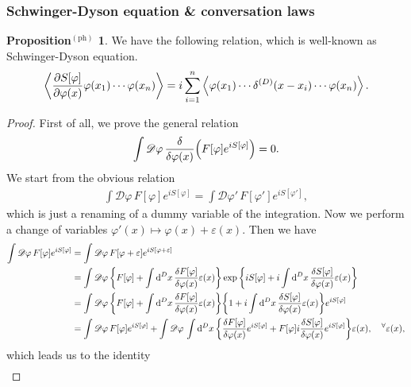 \documentclass{article}
\theoremstyle{definition}
\newtheorem{propositionph}{Proposition$^\mathrm{(ph)}$}[section]
\numberwithin{equation}{section}
\renewcommand{\mapsto}{\longmapsto}
\newcommand{\fivarphi}{\int \mathscr{D} \varphi\,}
\newcommand{\intst}{\int \dd^Dx \,}
\begin{document}
\subsubsection{Schwinger-Dyson equation \& conversation laws}
\begin{propositionph}
  We have the following relation, which is well-known as Schwinger-Dyson equation.
  \begin{align}
    \ev{\frac{\partial S[\varphi]}{\partial \varphi(x)} \varphi(x_1) \cdots \varphi(x_n)} = i \sum_{i = 1}^{n} \ev{\varphi(x_1) \cdots \delta^{(D)}(x - x_i) \cdots \varphi(x_n)}.
  \end{align}  
\end{propositionph}
\begin{proof}
  First of all, we prove the general relation
  \begin{align}
    \int \mathscr{D} \varphi \, \frac{\delta}{\delta \varphi(x)} \qty(F[\varphi] e^{iS[\varphi]}) = 0.
  \end{align}
  We start from the obvious relation
  \begin{align}
    \int \mathscr{D} \varphi \, F[\varphi] e^{iS[\varphi]} = \int \mathscr{D} \varphi' \, F[\varphi'] e^{iS[\varphi']},
  \end{align}
  which is just a renaming of a dummy variable of the integration. Now we perform a change of variables $\varphi'(x) \mapsto \varphi(x) + \varepsilon(x)$. Then we have
  \begin{align}
    \int \mathscr{D}\varphi \, F[\varphi] e^{iS[\varphi]}
    &= \fivarphi F[\varphi + \varepsilon]e^{iS[\varphi + \varepsilon]} \notag \\
    &= \fivarphi \qty{F[\varphi] + \intst \frac{\delta F[\varphi]}{\delta \varphi(x)} \varepsilon(x)}
      \exp\qty{iS[\varphi] + i \intst \frac{\delta S[\varphi]}{\delta \varphi(x)} \varepsilon(x)} \notag \\
    &= \fivarphi \qty{F[\varphi] + \intst \frac{\delta F[\varphi]}{\delta \varphi(x)} \varepsilon(x)}
      \qty{1 + i\intst \frac{\delta S[\varphi]}{\delta \varphi(x)}\varepsilon(x)}e^{iS[\varphi]} \notag \\
    &= \fivarphi F[\varphi] e^{iS[\varphi]} + \fivarphi \intst
      \qty{\frac{\delta F[\varphi]}{\delta\varphi(x)} e^{iS[\varphi]} + F[\varphi] i\frac{\delta S[\varphi]}{\delta \varphi(x)} e^{iS[\varphi]}}\varepsilon(x),
      \quad ^\forall \varepsilon(x),
  \end{align}
  which leads us to the identity
  \begin{align}

\end{align}
\end{proof}
\end{document}
